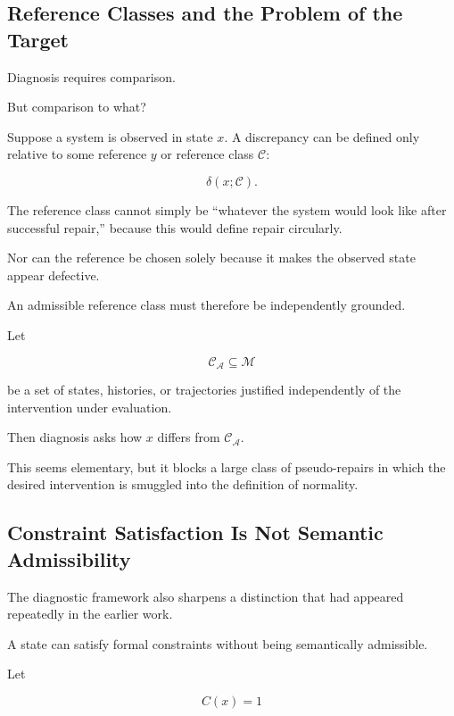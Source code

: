 \documentclass[11pt]{article}
\theoremstyle{remark}
\newcommand{\Adm}{\mathcal{A}}
\begin{document}
\subsection{Reference Classes and the Problem of the Target}

Diagnosis requires comparison.

But comparison to what?

Suppose a system is observed in state $x$. A discrepancy can be defined only relative to some reference $y$ or reference class $\mathcal{C}$:

\begin{equation}
\delta(x;\mathcal{C}).
\end{equation}

The reference class cannot simply be ``whatever the system would look like after successful repair,'' because this would define repair circularly.

Nor can the reference be chosen solely because it makes the observed state appear defective.

An admissible reference class must therefore be independently grounded.

Let

\begin{equation}
\mathcal{C}_{\Adm}
\subseteq
\mathcal{M}
\end{equation}

be a set of states, histories, or trajectories justified independently of the intervention under evaluation.

Then diagnosis asks how $x$ differs from $\mathcal{C}_{\Adm}$.

This seems elementary, but it blocks a large class of pseudo-repairs in which the desired intervention is smuggled into the definition of normality.

\subsection{Constraint Satisfaction Is Not Semantic Admissibility}

The diagnostic framework also sharpens a distinction that had appeared repeatedly in the earlier work.

A state can satisfy formal constraints without being semantically admissible.

Let

\begin{equation}
C(x)=1
\end{equation}
\end{document}
